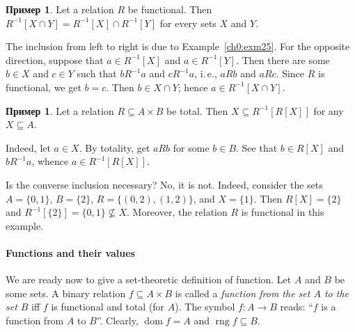 \documentclass[12pt,notitlepage]{article}
\theoremstyle{plain}
\theoremstyle{definition}
\newtheorem{exm}[thm]{Пример}
\theoremstyle{plain}
\newcommand{\sbs}{\subseteq}
\newcommand{\dom}{\mathop{\mathrm{dom}}}
\newcommand{\rng}{\mathop{\mathrm{rng}}}
\newcommand{\1}{\mathbf{1}}
\newcommand{\0}{\mathbf{0}}
\begin{document}
\begin{exm}
	Let a relation $R$ be functional. Then $R^{-1}[X \cap Y] = R^{-1}[X] \cap R^{-1}[Y]$ for every sets $X$ and $Y$.
	
	The inclusion from left to right is due to Example~\ref{ch0:exm25}. For the opposite direction, suppose that $a \in R^{-1}[X]$ and $a \in R^{-1}[Y]$. Then there are some $b \in X$ and $c \in Y$ such that $bR^{-1}a$ and $cR^{-1}a$, i.\,e., $a R b$ and $a R c$. Since $R$ is functional, we get $b = c$. Then $b \in X \cap Y$; hence $a \in R^{-1}[X \cap Y]$.
\end{exm}

\begin{exm}
	Let a relation $R \sbs A \times B$ be total. Then $X \sbs R^{-1}[R[X]]$ for any $X \sbs A$.
	
	Indeed, let $a \in X$. By totality, get $a R b$ for some $b \in B$. See that $b \in R[X]$ and $b R^{-1} a$, whence $a \in R^{-1}[R[X]]$.
	
	Is the converse inclusion necessary? No, it is not. Indeed, consider the sets $A = \{0,1\}$, $B = \{2\}$, $R = \{(0,2), (1,2)\}$, and $X = \{1\}$. Then $R[X] = \{2\}$ and $R^{-1}[\{2\}] = \{0,1\} \not\sbs X$. Moreover, the relation $R$ is functional in this example.
\end{exm}

\paragraph{Functions and their values} We are ready now to give a set-theoretic definition of function. Let  $A$ and $B$ be some sets. A binary relation $f \sbs A \times B$ is called a \emph{function from the set $A$ to the set $B$} iff $f$ is functional and total (for $A$). The symbol $f\colon A \to B$ reads: ``$f$ is a function from $A$ to $B$''. Clearly, $\dom f = A$ and $\rng f \sbs B$.
\end{document}
